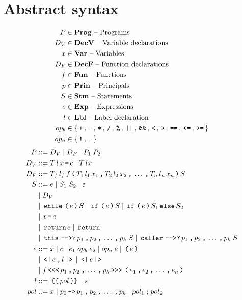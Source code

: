 \section{Abstract syntax}

\begin{align*}
  P       & \in \mathbf{Prog} \text{ -- Programs}\\
  D_V     & \in \mathbf{DecV} \text{ -- Variable declarations}\\
  x       & \in \mathbf{Var} \text{ -- Variables}\\
  D_F     & \in \mathbf{DecF} \text{ -- Function declarations}\\
  f       & \in \mathbf{Fun} \text{ -- Functions}\\
  p       & \in \mathbf{Prin} \text{ -- Principals}\\
  S       & \in \mathbf{Stm} \text{ -- Statements}\\
  e       & \in \mathbf{Exp} \text{ -- Expressions}\\
  l       & \in \mathbf{Lbl} \text{ -- Label declaration}\\
  op_b    & \in \{ \, \texttt{+} \, ,  \, \texttt{-} \, ,  \, \texttt{*} \, ,  \, \texttt{/} \, ,  \, \texttt{\%} \, ,  \, \texttt{||} \, ,  \, \texttt{\&\&} \, ,  \, \texttt{<} \, ,  \, \texttt{>} \, ,  \, \texttt{==} \, ,  \, \texttt{<=} \, ,  \, \texttt{>=} \, \} \\
  op_u    & \in \{ \, \texttt{!} \, ,  \, \texttt{-} \, \}
\end{align*}
\begin{align*}
  P         & ::= D_V \gp D_F \gp P_1 \; P_2 \\
  D_V       & ::= T \, l \, x \tk = e \gp T \, l x \\
  D_F       & ::= T_f \, l_f \, f \tk ( T_1 \, l_1 \, x_1 \tk , T_2 \, l_2 \, x_2 \tk , \dots \tk , T_n \, l_n \, x_n \tk ) S \\
  S         & ::= e \gp S_1 \; S_2 \gp \varepsilon \\
            & \gp D_V \\
            & \gp \tk{while} \tk ( e \tk ) S \gp \tk{if} \tk ( e \tk ) S \gp \tk{if} \tk ( e \tk ) S_1 \tk{else} S_2 \\
            & \gp x \tk = e \\
            & \gp \tk{return} e \gp \tk{return} \\
            & \gp \tk{this} \tk{-{}->?} p_1 \tk , p_2 \tk , \dots \tk , p_k \; S \gp \tk{caller} \tk{-{}->?} p_1 \tk , p_2 \tk , \dots \tk , p_k \; S \\
  e         & ::= x \gp c \gp e_1 \; op_b \; e_2 \gp op_u \; e \gp \tk ( e \tk ) \\
            & \gp \tk{<|} e \tk , l \tk{|>} \gp \tk{<|} e \tk{|>} \\
            & \gp f \tk{<{}<{}<} p_1 \tk , p_2 \tk , \dots \tk , p_k \tk{>{}>{}>} \tk ( e_1 \tk , e_2 \tk , \dots \tk , e_n \tk ) \\
  l         & ::= \tk{\{\{} pol \tk{\}\}} \gp \varepsilon \\
  pol       & ::= x \gp p_0 \tk{->} p_1 \tk , p_2 \tk , \dots \tk , p_k \gp pol_1 \tk ; pol_2
\end{align*}
